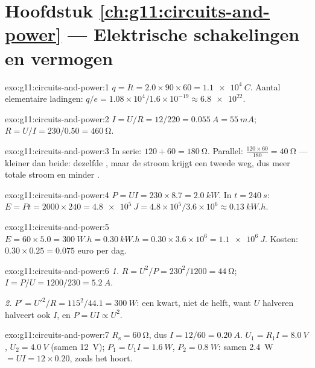 \section*{Hoofdstuk \ref{ch:g11:circuits-and-power} --- Elektrische schakelingen en vermogen}

\begin{solution}{exo:g11:circuits-and-power:1}
$q = It = 2.0 \times 90 \times 60 = \qty{1.1e4}{C}$. Aantal elementaire
ladingen: $q/e = 1.08\times10^{4}/1.6\times10^{-19} \approx \num{6.8e22}$.
\end{solution}

\begin{solution}{exo:g11:circuits-and-power:2}
$I = U/R = 12/220 = \qty{0.055}{A} = \qty{55}{mA}$;
$R = U/I = 230/0.50 = \qty{460}{\ohm}$.
\end{solution}

\begin{solution}{exo:g11:circuits-and-power:3}
In serie: $120 + 60 = \qty{180}{\ohm}$. Parallel:
$\frac{120 \times 60}{180} = \qty{40}{\ohm}$ --- kleiner dan beide:
dezelfde , maar de stroom krijgt een tweede weg, dus meer totale
stroom en minder .
\end{solution}

\begin{solution}{exo:g11:circuits-and-power:4}
$P = UI = 230 \times 8.7 = \qty{2.0}{kW}$. In $t = \qty{240}{s}$:
$E = Pt = 2000 \times 240 = \qty{4.8e5}{J} = 4.8\times10^{5}/3.6
\times10^{6} \approx \qty{0.13}{kW.h}$.
\end{solution}

\begin{solution}{exo:g11:circuits-and-power:5}
$E = 60 \times 5.0 = \qty{300}{W.h} = \qty{0.30}{kW.h} = 0.30 \times
3.6\times10^{6} = \qty{1.1e6}{J}$. Kosten: $0.30 \times 0.25 = 0.075$
euro per dag.
\end{solution}

\begin{solution}{exo:g11:circuits-and-power:6}
\emph{1.} $R = U^2/P = 230^2/1200 = \qty{44}{\ohm}$;
$I = P/U = 1200/230 = \qty{5.2}{A}$.

\emph{2.} $P' = U'^2/R = 115^2/44.1 = \qty{300}{W}$: een kwart, niet de
helft, want $U$ halveren halveert ook $I$, en $P = UI \propto U^2$.
\end{solution}

\begin{solution}{exo:g11:circuits-and-power:7}
$R_{\text{s}} = \qty{60}{\ohm}$, dus $I = 12/60 = \qty{0.20}{A}$.
$U_1 = R_1 I = \qty{8.0}{V}$, $U_2 = \qty{4.0}{V}$ (samen \qty{12}{V});
$P_1 = U_1 I = \qty{1.6}{W}$, $P_2 = \qty{0.8}{W}$: samen \qty{2.4}{W}
$= UI = 12 \times 0.20$, zoals het hoort.
\end{solution}

